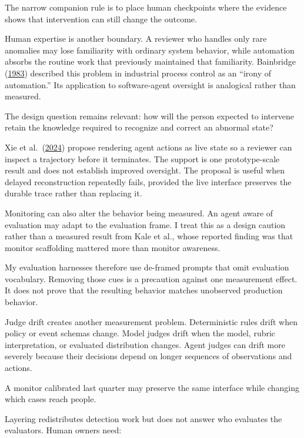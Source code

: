 The narrow companion rule is to place human checkpoints where the evidence shows that intervention can still change the outcome.

Human expertise is another boundary. A reviewer who handles only rare anomalies may lose familiarity with ordinary system behavior, while automation absorbs the routine work that previously maintained that familiarity. Bainbridge (\href{https://doi.org/10.1016/0005-1098(83)90046-8}{1983}) described this problem in industrial process control as an ``irony of automation.'' Its application to software-agent oversight is analogical rather than measured.

The design question remains relevant: how will the person expected to intervene retain the knowledge required to recognize and correct an abnormal state?

Xie et al.~(\href{https://arxiv.org/abs/2408.01703}{2024}) propose rendering agent actions as live state so a reviewer can inspect a trajectory before it terminates. The support is one prototype-scale result and does not establish improved oversight. The proposal is useful when delayed reconstruction repeatedly fails, provided the live interface preserves the durable trace rather than replacing it.

Monitoring can also alter the behavior being measured. An agent aware of evaluation may adapt to the evaluation frame. I treat this as a design caution rather than a measured result from Kale et al., whose reported finding was that monitor scaffolding mattered more than monitor awareness.

My evaluation harnesses therefore use de-framed prompts that omit evaluation vocabulary. Removing those cues is a precaution against one measurement effect. It does not prove that the resulting behavior matches unobserved production behavior.

Judge drift creates another measurement problem. Deterministic rules drift when policy or event schemas change. Model judges drift when the model, rubric interpretation, or evaluated distribution changes. Agent judges can drift more severely because their decisions depend on longer sequences of observations and actions.

A monitor calibrated last quarter may preserve the same interface while changing which cases reach people.


Layering redistributes detection work but does not answer who evaluates the evaluators. Human owners need:


